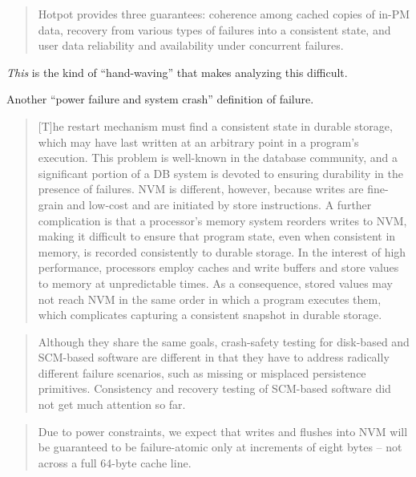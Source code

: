 \begin{quotation}
    Hotpot provides three guarantees: coherence among cached copies
of in-PM data, recovery from various types of failures into a consistent
state, and user data reliability and availability under concurrent
failures.
    \cite{shan2017distributed}
\end{quotation}

\textit{This} is the kind of ``hand-waving'' that makes analyzing this difficult.

Another ``power failure and system crash'' definition of failure.\cite{liu2017durable}

\begin{quotation}
    [T]he restart mechanism must find a consistent state in durable storage, which may
have last written at an arbitrary point in a program’s execution. This problem is well-known in the
database community, and a significant portion of a DB system is devoted to ensuring durability in the
presence of failures. NVM is different, however, because writes are fine-grain and low-cost and are
initiated by store instructions. A further complication is that a processor’s memory system reorders
writes to NVM, making it difficult to ensure that program state, even when consistent in memory,
is recorded consistently to durable storage. In the interest of high performance, processors employ
caches and write buffers and store values to memory at unpredictable times. As a consequence,
stored values may not reach NVM in the same order in which a program executes them, which
complicates capturing a consistent snapshot in durable storage.\cite{Cohen:2017:ELN:3152284.3133891}
\end{quotation}

\begin{quotation}
    Although they share the same goals, crash-safety testing for
disk-based and SCM-based software are different in that they
have to address radically different failure scenarios, such as
missing or misplaced persistence primitives. Consistency and
recovery testing of SCM-based software did not get much
attention so far.\cite{oukid2017data}
\end{quotation}

\begin{quotation}
    Due to power constraints, we expect that writes and flushes into
NVM will be guaranteed to be failure-atomic only at increments of eight bytes – not across a
full 64-byte cache line.\cite{nawab2017dali}
\end{quotation}

